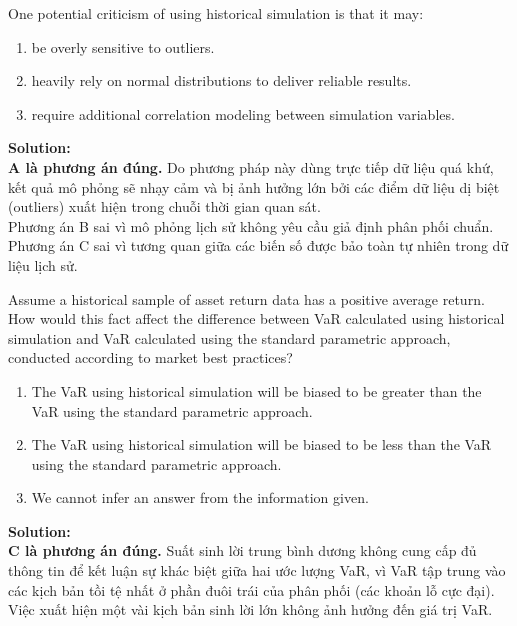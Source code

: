 \begin{tcolorbox}[
	colback=gray!5!white,
	colframe=black!15!white,
	boxrule=0.5pt,
	arc=3pt,
	title=\textbf{Question 2},
	coltitle=black,
	colbacktitle=black!5!white,
	before skip=6pt,
	after skip=6pt,
	breakable
]
One potential criticism of using historical simulation is that it may:
\begin{enumerate}[label=\Alph*.]
	\item be overly sensitive to outliers.
	\item heavily rely on normal distributions to deliver reliable results.
	\item require additional correlation modeling between simulation variables.
\end{enumerate}

\textbf{Solution:} \\
\textbf{A là phương án đúng.} Do phương pháp này dùng trực tiếp dữ liệu quá khứ, kết quả mô phỏng sẽ nhạy cảm và bị ảnh hưởng lớn bởi các điểm dữ liệu dị biệt (outliers) xuất hiện trong chuỗi thời gian quan sát. \\
Phương án B sai vì mô phỏng lịch sử không yêu cầu giả định phân phối chuẩn. \\
Phương án C sai vì tương quan giữa các biến số được bảo toàn tự nhiên trong dữ liệu lịch sử.
\end{tcolorbox}

\begin{tcolorbox}[
	colback=gray!5!white,
	colframe=black!15!white,
	boxrule=0.5pt,
	arc=3pt,
	title=\textbf{Question 3},
	coltitle=black,
	colbacktitle=black!5!white,
	before skip=6pt,
	after skip=6pt,
	breakable
]
Assume a historical sample of asset return data has a positive average return. How would this fact affect the difference between VaR calculated using historical simulation and VaR calculated using the standard parametric approach, conducted according to market best practices?
\begin{enumerate}[label=\Alph*.]
	\item The VaR using historical simulation will be biased to be greater than the VaR using the standard parametric approach.
	\item The VaR using historical simulation will be biased to be less than the VaR using the standard parametric approach.
	\item We cannot infer an answer from the information given.
\end{enumerate}

\textbf{Solution:} \\
\textbf{C là phương án đúng.} Suất sinh lời trung bình dương không cung cấp đủ thông tin để kết luận sự khác biệt giữa hai ước lượng VaR, vì VaR tập trung vào các kịch bản tồi tệ nhất ở phần đuôi trái của phân phối (các khoản lỗ cực đại). Việc xuất hiện một vài kịch bản sinh lời lớn không ảnh hưởng đến giá trị VaR.
\end{tcolorbox}

